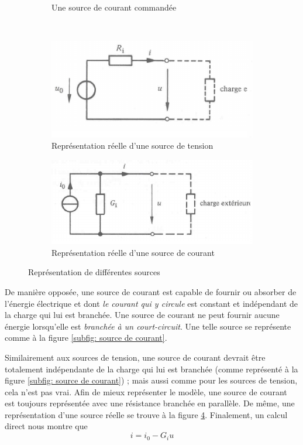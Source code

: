\documentclass[12pt,a4paper]{article}
\begin{document}
\begin{figure}
\begin{subfigure}[b]{0.27\textwidth}
		\caption{Une source de courant commandée}
		\label{subfig: source de courant commandee}
	\end{subfigure}\\
	\begin{subfigure}[b]{0.45\textwidth}
		\centering
		\includegraphics[scale=0.7]{images/tension_reelle}
		\caption{Représentation réelle d'une source de tension}
		\label{subfig: source tension reelle}
	\end{subfigure}
	\begin{subfigure}[b]{0.45\textwidth}
		\centering
		\includegraphics[scale=0.7]{images/courant_reelle}
		\caption{Représentation réelle d'une source de courant}
		\label{subfig: source courant reelle}
	\end{subfigure}	
	\caption{Représentation de différentes sources}
\end{figure}
De manière opposée, une source de courant est capable de fournir ou absorber de l'énergie électrique et dont \textit{le courant qui y circule} est constant et indépendant de la charge qui lui est branchée. Une source de courant ne peut fournir aucune énergie lorsqu'elle est \textit{branchée à un court-circuit}. Une telle source se représente comme à la figure  \ref{subfig: source de courant}.

 Similairement aux sources de tension, une source de courant devrait être totalement indépendante de la charge qui lui est branchée (comme représenté à la figure \ref{subfig: source de courant}) ; mais aussi comme pour les sources de tension, cela n'est pas vrai. Afin de mieux représenter le modèle, une source de courant est toujours représentée avec une résistance branchée en parallèle. De même, une représentation d'une source réelle se trouve à la figure \ref{subfig: source courant reelle}. Finalement, un calcul direct nous montre que 
\begin{equation}
	i = i_0 - G_iu
	\label{equ: resistance interne courant}
\end{equation}
\end{document}
